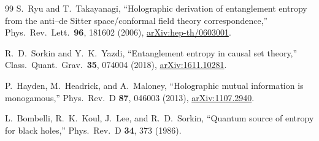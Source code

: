 \documentclass[aps,prd,twocolumn,superscriptaddress,nofootinbib]{revtex4-2}
\begin{document}
\begin{thebibliography}{99}
S.~Ryu and T.~Takayanagi,
``Holographic derivation of entanglement entropy from the anti--de Sitter space/conformal field theory correspondence,''
Phys.\ Rev.\ Lett.\ \textbf{96}, 181602 (2006),
\href{https://arxiv.org/abs/hep-th/0603001}{arXiv:hep-th/0603001}.

R.~D.~Sorkin and Y.~K.~Yazdi,
``Entanglement entropy in causal set theory,''
Class.\ Quant.\ Grav.\ \textbf{35}, 074004 (2018),
\href{https://arxiv.org/abs/1611.10281}{arXiv:1611.10281}.

P.~Hayden, M.~Headrick, and A.~Maloney,
``Holographic mutual information is monogamous,''
Phys.\ Rev.\ D \textbf{87}, 046003 (2013),
\href{https://arxiv.org/abs/1107.2940}{arXiv:1107.2940}.

L.~Bombelli, R.~K.~Koul, J.~Lee, and R.~D.~Sorkin,
``Quantum source of entropy for black holes,''
Phys.\ Rev.\ D \textbf{34}, 373 (1986).

\end{thebibliography}
\end{document}
